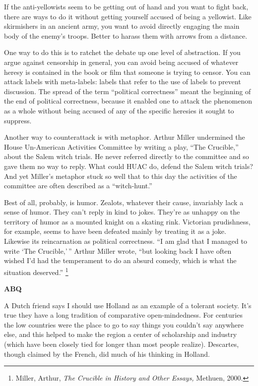 \documentclass[12pt]{book}
\begin{document}
If the anti-yellowists seem to be getting out of hand and you want to
fight back, there are ways to do it without getting yourself accused of
being a yellowist. Like skirmishers in an ancient army, you want to
avoid directly engaging the main body of the enemy's troops. Better to
harass them with arrows from a distance.

One way to do this is to ratchet the debate up one level of abstraction.
If you argue against censorship in general, you can avoid being accused
of whatever heresy is contained in the book or film that someone is
trying to censor. You can attack labels with meta-labels: labels that
refer to the use of labels to prevent discussion. The spread of the term
``political correctness'' meant the beginning of the end of political
correctness, because it enabled one to attack the phenomenon as a whole
without being accused of any of the specific heresies it sought to
suppress.

Another way to counterattack is with metaphor. Arthur Miller undermined
the House Un-American Activities Committee by writing a play, ``The
Crucible,'' about the Salem witch trials. He never referred directly to
the committee and so gave them no way to reply. What could HUAC do,
defend the Salem witch trials? And yet Miller's metaphor stuck so well
that to this day the activities of the committee are often described as
a ``witch-hunt.''

Best of all, probably, is humor. Zealots, whatever their cause,
invariably lack a sense of humor. They can't reply in kind to jokes.
They're as unhappy on the territory of humor as a mounted knight on a
skating rink. Victorian prudishness, for example, seems to have been
defeated mainly by treating it as a joke. Likewise its reincarnation as
political correctness. ``I am glad that I managed to write `The
Crucible,'\,'' Arthur Miller wrote, ``but looking back I have often
wished I'd had the temperament to do an absurd comedy, which is what the
situation deserved.'' \footnote{Miller, Arthur, \emph{The Crucible in History and Other
Essays,} Methuen, 2000.}

\textbf{ABQ}

A Dutch friend says I should use Holland as an example of a tolerant
society. It's true they have a long tradition of comparative
open-mindedness. For centuries the low countries were the place to go to
say things you couldn't say anywhere else, and this helped to make the
region a center of scholarship and industry (which have been closely
tied for longer than most people realize). Descartes, though claimed by
the French, did much of his thinking in Holland.
\end{document}
